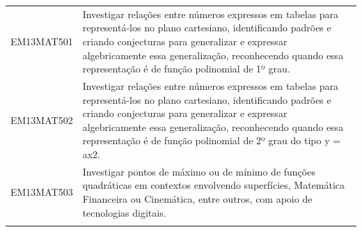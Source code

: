 \documentclass[12pt]{extarticle}
\begin{document}
\begin{longtable}{ll}
EM13MAT501 & Investigar relações entre números expressos em tabelas para representá-los no plano cartesiano, identificando padrões e criando conjecturas para generalizar e expressar algebricamente essa generalização, reconhecendo quando essa representação é de função polinomial de 1º grau.                                                                                                                                                                                                                                                                                                                                                                                                                                                                                                                                 \\
\rowcolor[HTML]{E0F7FA} 
EM13MAT502 & Investigar relações entre números expressos em tabelas para representá-los no plano cartesiano, identificando padrões e criando conjecturas para generalizar e expressar algebricamente essa generalização, reconhecendo quando essa representação é de função polinomial de 2º grau do tipo y = ax2.                                                                                                                                                                                                                                                                                                                                                                                                                                                                                                                 \\
\rowcolor[HTML]{FFF} 
EM13MAT503 & Investigar pontos de máximo ou de mínimo de funções quadráticas em contextos envolvendo superfícies, Matemática Financeira ou Cinemática, entre outros, com apoio de tecnologias digitais.                                                                                                                                                                                                                                                                                                                                                                                                                                                                                                                                                                                                                            \\
\rowcolor[HTML]{E0F7FA} 

\end{longtable}
\end{document}
